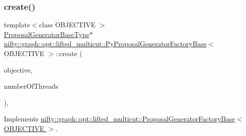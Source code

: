 \subsubsection{\texorpdfstring{create()}{create()}}
{\footnotesize\ttfamily template$<$class O\+B\+J\+E\+C\+T\+I\+VE $>$ \\
\hyperlink{classnifty_1_1graph_1_1opt_1_1lifted__multicut_1_1ProposalGeneratorFactoryBase_ab201fe6397370621b50977e67ae55ace}{Proposal\+Generator\+Base\+Type}$\ast$ \hyperlink{classnifty_1_1graph_1_1opt_1_1lifted__multicut_1_1PyProposalGeneratorFactoryBase}{nifty\+::graph\+::opt\+::lifted\+\_\+multicut\+::\+Py\+Proposal\+Generator\+Factory\+Base}$<$ O\+B\+J\+E\+C\+T\+I\+VE $>$\+::create (\begin{DoxyParamCaption}\item[{const \hyperlink{classnifty_1_1graph_1_1opt_1_1lifted__multicut_1_1ProposalGeneratorFactoryBase_a1986f0a3868e76ba5613f49ca4fc7dc6}{Objective\+Type} \&}]{objective,  }\item[{const size\+\_\+t}]{number\+Of\+Threads }\end{DoxyParamCaption})\hspace{0.3cm}{\ttfamily [inline]}, {\ttfamily [virtual]}}



Implements \hyperlink{classnifty_1_1graph_1_1opt_1_1lifted__multicut_1_1ProposalGeneratorFactoryBase_ab8e4ade9126be9f4c4b7f64277a43b29}{nifty\+::graph\+::opt\+::lifted\+\_\+multicut\+::\+Proposal\+Generator\+Factory\+Base$<$ O\+B\+J\+E\+C\+T\+I\+V\+E $>$}.

\mbox{\label{classnifty_1_1graph_1_1opt_1_1lifted__multicut_1_1PyProposalGeneratorFactoryBase_a1a74cc625dc38c80bf2bf64593a13346}} 
